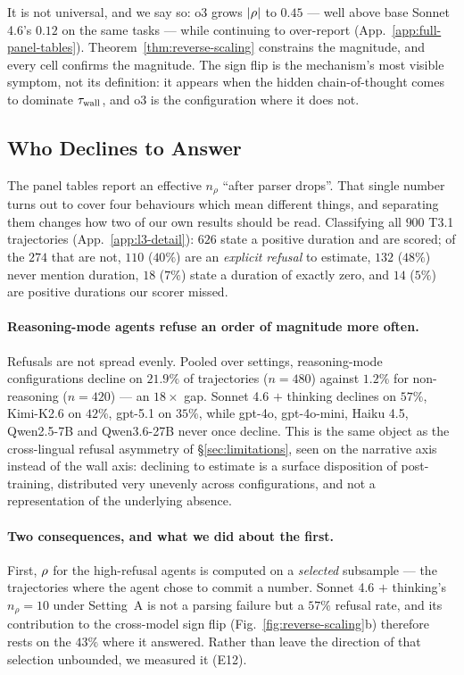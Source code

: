 It is not universal, and we say so: o3 grows $|\rho|$ to $0.45$ --- well above base Sonnet 4.6's $0.12$ on the same tasks --- while continuing to over-report (App.~\ref{app:full-panel-tables}). Theorem~\ref{thm:reverse-scaling} constrains the magnitude, and every cell confirms the magnitude. The sign flip is the mechanism's most visible symptom, not its definition: it appears when the hidden chain-of-thought comes to dominate $\tau_{\mathrm{wall}}$, and o3 is the configuration where it does not.

\subsection{Who Declines to Answer}
\label{ssec:refusal}

The panel tables report an effective $n_\rho$ ``after parser drops''. That
single number turns out to cover four behaviours which mean different things,
and separating them changes how two of our own results should be read.
Classifying all $900$ T3.1 trajectories (App.~\ref{app:l3-detail}): $626$ state
a positive duration and are scored; of the $274$ that are not, $110$ ($40\%$)
are an \emph{explicit refusal} to estimate, $132$ ($48\%$) never mention
duration, $18$ ($7\%$) state a duration of exactly zero, and $14$ ($5\%$) are
positive durations our scorer missed.

\paragraph{Reasoning-mode agents refuse an order of magnitude more often.}
Refusals are not spread evenly. Pooled over settings, reasoning-mode
configurations decline on $21.9\%$ of trajectories ($n = 480$) against $1.2\%$
for non-reasoning ($n = 420$) --- an $18\times$ gap. Sonnet 4.6 $+$ thinking
declines on $57\%$, Kimi-K2.6 on $42\%$, gpt-5.1 on $35\%$, while gpt-4o,
gpt-4o-mini, Haiku 4.5, Qwen2.5-7B and Qwen3.6-27B never once decline. This is
the same object as the cross-lingual refusal asymmetry of
\S\ref{sec:limitations}, seen on the narrative axis instead of the wall axis:
declining to estimate is a surface disposition of post-training, distributed
very unevenly across configurations, and not a representation of the
underlying absence.

\paragraph{Two consequences, and what we did about the first.}
First, $\rho$ for the high-refusal agents is computed on a \emph{selected}
subsample --- the trajectories where the agent chose to commit a number.
Sonnet 4.6 $+$ thinking's $n_\rho = 10$ under Setting~A is not a parsing
failure but a $57\%$ refusal rate, and its contribution to the cross-model sign
flip (Fig.~\ref{fig:reverse-scaling}b) therefore rests on the $43\%$ where it
answered. Rather than leave the direction of that selection unbounded, we
measured it (E12).

